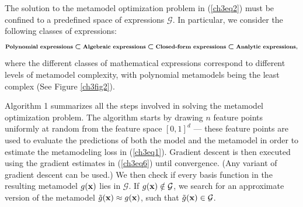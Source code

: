 \documentclass [PhD] {uclathes}
\begin{document}
The solution to the metamodel optimization problem in (\ref{ch3eq2}) must be confined to a predefined space of expressions $\mathcal{G}$. In particular, we consider the following classes of expressions: 
\begin{align}
\mbox{\footnotesize \bf Polynomial expressions} \boldsymbol{\subset} \mbox{\footnotesize  \bf Algebraic expressions} \boldsymbol{\subset} \mbox{\footnotesize \bf Closed-form expressions} \boldsymbol{\subset} \mbox{\footnotesize \bf Analytic expressions}, \nonumber
\end{align}
where the different classes of mathematical expressions correspond to different levels of metamodel complexity, with polynomial metamodels being the least complex (See Figure \ref{ch3fig2}).

Algorithm 1 summarizes all the steps involved in solving the metamodel optimization problem. The algorithm starts by drawing $n$ feature points uniformly at random from the feature space $[0,1]^d$ --- these feature points are used to evaluate the predictions of both the model and the metamodel in order to estimate the metamodeling loss in (\ref{ch3eq1}). Gradient descent is then executed using the gradient estimates in (\ref{ch3eq6}) until convergence. (Any variant of gradient descent can be used.) We then check if every basis function in the resulting metamodel $g({\bf x})$ lies in $\mathcal{G}$. If $g({\bf x}) \notin \mathcal{G}$, we search for an approximate version of the metamodel $\tilde{g}({\bf x}) \approx g({\bf x})$, such that $\tilde{g}({\bf x}) \in \mathcal{G}$.  
\end{document}
